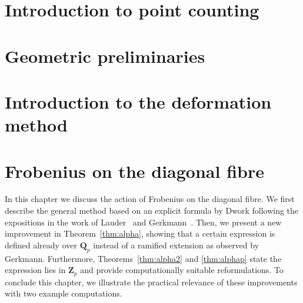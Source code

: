 
\chapter{Introduction to point counting}


\chapter{Geometric preliminaries}


\chapter{Introduction to the deformation method}


\chapter{Frobenius on the diagonal fibre}

In this chapter we discuss the action of Frobenius on the diagonal fibre. 
We first describe the general method based on an explicit formula by Dwork 
following the expositions in the work of Lauder~\citep[Section~6]{Lau04} 
and Gerkmann~\citep[Section~4.4]{Gerkmann2007}.  Then, we present a new 
improvement in Theorem~\ref{thm:alpha}, showing that a certain 
expression is defined already over $\mathbf{Q}_p$ instead of a ramified 
extension as observed by Gerkmann.  Furthermore, Theorems~\ref{thm:alpha2} 
and \ref{thm:alphap} state the expression lies in $\mathbf{Z}_p$ and 
provide computationally suitable reformulations.  To conclude this chapter, 
we illustrate the practical relevance of these improvements with two example 
computations.

